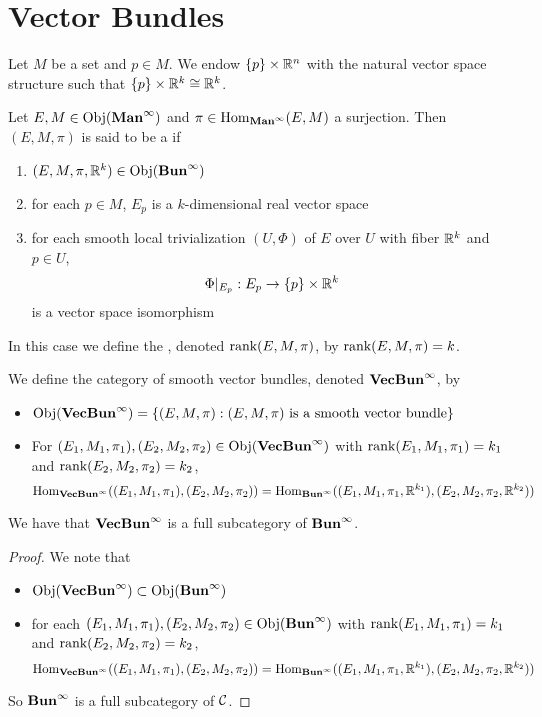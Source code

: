 \documentclass{book}
\begin{document}
	\newpage
	\chapter{Vector Bundles}

	\begin{note}
		Let $M$ be a set and $p \in M$. We endow $\{p\} \times \R^n$ with the natural vector space structure such that $\{p\} \times \R^k \cong \R^k$.
	\end{note}

	\begin{defn}
		Let $E,M \in \Obj(\Maninf)$ and $\pi \in \Hom_{\Maninf}(E, M)$ a surjection. Then $(E, M, \pi)$ is said to be a  if 
		\begin{enumerate}
			\item $(E, M, \pi, \R^k) \in \Obj(\Buninf)$
			\item for each $p \in M$, $E_p$ is a $k$-dimensional real vector space
			\item for each smooth local trivialization $(U, \Phi)$ of $E$ over $U$ with fiber $\R^k$ and $p \in U$, $$\Phi|_{E_p}: E_p \rightarrow \{p\} \times \R^k$$ is a vector space isomorphism
		\end{enumerate}
		In this case we define the , denoted $\rnk (E, M, \pi)$, by $ \rnk (E, M, \pi) = k$.
	\end{defn}

\begin{defn}
	We define the category of smooth vector bundles, denoted $\VecBuninf$, by 
	\begin{itemize}
		\item $\Obj(\VecBuninf) = \{(E, M, \pi): (E, M, \pi) \text{ is a smooth vector bundle}\}$
		\item For $(E_1, M_1, \pi_1), (E_2, M_2, \pi_2) \in \Obj(\VecBuninf)$ with $\rnk (E_1, M_1, \pi_1) = k_1$ and $\rnk (E_2, M_2, \pi_2) = k_2$,  
		$$\Hom_{\VecBuninf}((E_1, M_1, \pi_1), (E_2, M_2, \pi_2)) = \Hom_{\Buninf}((E_1, M_1, \pi_1, \R^{k_1}), (E_2, M_2, \pi_2, \R^{k_2}))$$
	\end{itemize}
\end{defn}

\begin{ex}
	We have that $\VecBuninf$ is a full subcategory of $\Buninf$.
\end{ex}

\begin{proof} We note that 
	\begin{itemize}
		\item $\Obj(\VecBuninf) \subset \Obj(\Buninf)$
		\item for each $(E_1, M_1, \pi_1), (E_2, M_2, \pi_2) \in \Obj(\Buninf)$ with $\rnk (E_1, M_1, \pi_1) = k_1$ and $\rnk (E_2, M_2, \pi_2) = k_2$, 
		$$\Hom_{\VecBuninf}((E_1, M_1, \pi_1), (E_2, M_2, \pi_2)) = \Hom_{\Buninf}((E_1, M_1, \pi_1, \R^{k_1}), (E_2, M_2, \pi_2, \R^{k_2}))$$
	\end{itemize}
	So $\Buninf$ is a full subcategory of $\MC$.
\end{proof}
\end{document}
